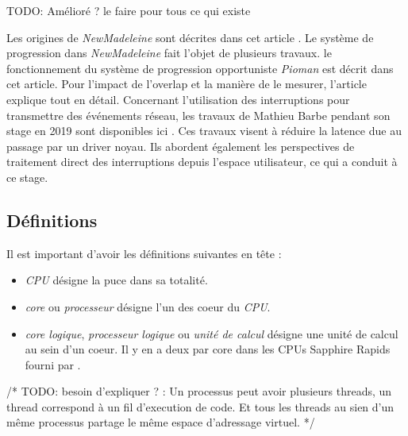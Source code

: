 TODO: Amélioré ? le faire pour tous ce qui existe


Les origines de \emph{NewMadeleine} sont décrites dans cet article \cite{aumage:inria-00127356}.
Le système de progression dans \emph{NewMadeleine} fait l'objet de plusieurs travaux.
le fonctionnement du système de progression opportuniste \emph{Pioman} est décrit dans cet article\cite{denis:hal-01087775}.
Pour l'impact de l'overlap et la manière de le mesurer, l'article \cite{denis:hal-01324179} explique tout en détail.
Concernant l'utilisation des interruptions pour transmettre des événements réseau, les travaux de Mathieu Barbe pendant son stage en 2019 sont disponibles ici \cite{internshipMathieu}.
Ces travaux visent à réduire la latence due au passage par un driver noyau.
Ils abordent également les perspectives de traitement direct des interruptions depuis l'espace utilisateur, ce qui a conduit à ce stage.


\subsection{Définitions} %

Il est important d'avoir les définitions suivantes en tête :
\begin{itemize}
  \item \emph{CPU} désigne la puce dans sa totalité.
  \item \emph{core} ou \emph{processeur} désigne l'un des coeur du \emph{CPU}.
  \item \emph{core logique}, \emph{processeur logique} ou \emph{unité de calcul} %
  désigne une unité de calcul au sein d'un coeur. Il y en a deux par core dans les CPUs \intel{} Sapphire Rapids fourni par \atos{}.
\end{itemize}

/* TODO: besoin d'expliquer ? : Un processus peut avoir plusieurs threads, un thread correspond à un fil d'execution de code. Et tous les threads au sien d'un même processus partage le même espace d'adressage virtuel. */
